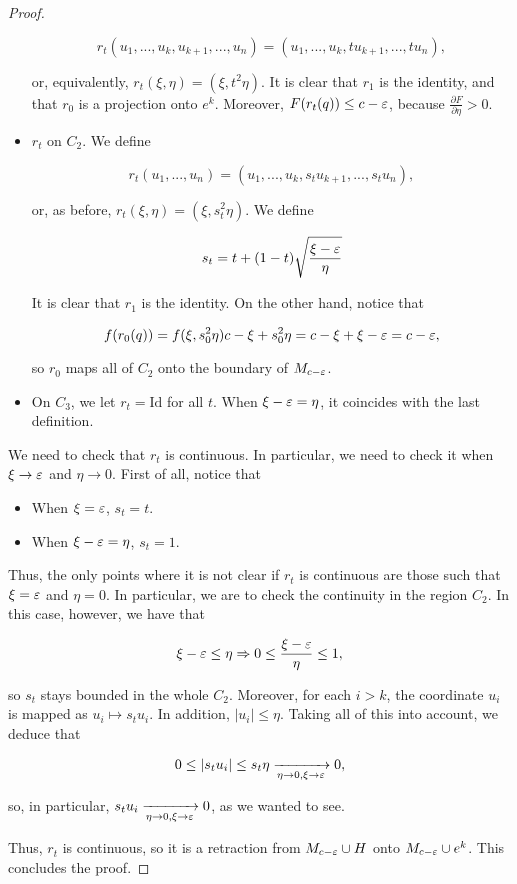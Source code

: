 \begin{proof}
\begin{itemize}
	$$r_t(u_1,...,u_k,u_{k+1},...,u_n) = (u_1,...,u_k,tu_{k+1},...,tu_n) ,$$

	or, equivalently, $r_t(\xi,\eta) = (\xi,t^2\eta)$. It is clear that $r_1$ is the identity, and that $r_0$ is a projection onto $e^k$. Moreover, $F(r_t(q)) \leq c - \varepsilon$, because $\frac{\partial F}{\partial \eta} > 0$.
	\item $r_t$ on $C_2$. We define

	$$r_t(u_1,...,u_n) = (u_1,...,u_k,s_tu_{k+1},...,s_tu_n) ,$$

	or, as before, $r_t(\xi,\eta) = (\xi, s_t^2 \eta)$. We define

	$$s_t = t + (1-t) \sqrt{\frac{\xi-\varepsilon}{\eta}}$$

	It is clear that $r_1$ is the identity. On the other hand, notice that

	$$f(r_0(q)) = f(\xi,s_0^2\eta) c - \xi + s_0^2 \eta = c - \xi + \xi - \varepsilon = c -\varepsilon,$$

	so $r_0$ maps all of $C_2$ onto the boundary of $M_{c-\varepsilon}$.
	\item On $C_3$, we let $r_t = \text{Id}$ for all $t$. When $\xi - \varepsilon = \eta$, it coincides with the last definition.
\end{itemize}

We need to check that $r_t$ is continuous. In particular, we need to check it when $\xi \rightarrow \varepsilon$ and $\eta \rightarrow 0$. First of all, notice that

\begin{itemize}
	\item When $\xi = \varepsilon$, $s_t = t$.
	\item When $\xi - \varepsilon = \eta$, $s_t = 1$.
\end{itemize}

Thus, the only points where it is not clear if $r_t$ is continuous are those such that $\xi = \varepsilon$ and $\eta = 0$. In particular, we are to check the continuity in the region $C_2$. In this case, however, we have that

$$\xi - \varepsilon \leq \eta \Rightarrow 0 \leq \frac{\xi - \varepsilon}{\eta} \leq 1,$$

so $s_t$ stays bounded in the whole $C_2$. Moreover, for each $i > k$, the coordinate $u_i$ is mapped as $u_i \mapsto s_t u_i$. In addition, $|u_i| \leq \eta$. Taking all of this into account, we deduce that

$$0 \leq |s_tu_i| \leq s_t\eta \xrightarrow[\eta \rightarrow 0, \xi \rightarrow \varepsilon]{} 0 ,$$

so, in particular, $s_tu_i \xrightarrow[\eta \rightarrow 0, \xi \rightarrow \varepsilon]{} 0$, as we wanted to see.

Thus, $r_t$ is continuous, so it is a retraction from $M_{c-\varepsilon} \cup H$ onto $M_{c-\varepsilon} \cup e^k$. This concludes the proof.
\end{proof}
